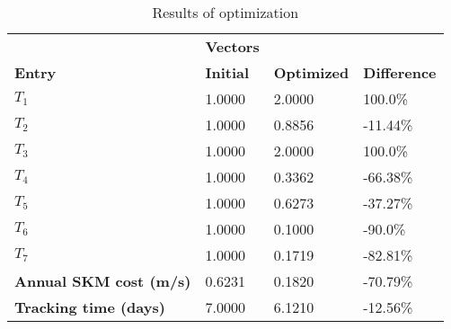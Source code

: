 \begin{table}[H]
\centering
\begin{tabular}{llll}
\textbf{}      & \cellcolor[HTML]{EFEFEF}\textbf{Vectors} & \textbf{} & \textbf{}         \\
\rowcolor[HTML]{EFEFEF} 
\textbf{Entry} & \textbf{Initial} & \textbf{Optimized} & \textbf{Difference} \\
$T_1$ & 1.0000 & 2.0000 & 100.0\% \\ 
$T_2$ & 1.0000 & 0.8856 & -11.44\% \\ 
$T_3$ & 1.0000 & 2.0000 & 100.0\% \\ 
$T_4$ & 1.0000 & 0.3362 & -66.38\% \\ 
$T_5$ & 1.0000 & 0.6273 & -37.27\% \\ 
$T_6$ & 1.0000 & 0.1000 & -90.0\% \\ 
$T_7$ & 1.0000 & 0.1719 & -82.81\% \\ 
\rowcolor[HTML]{EFEFEF} 
\textbf{Annual SKM cost (m/s)}  & 0.6231 & 0.1820 & -70.79\% \\ 
\rowcolor[HTML]{EFEFEF} 
\textbf{Tracking time (days)}  & 7.0000 & 6.1210 & -12.56\% \\ 
\end{tabular}
\caption{Results of optimization}
\label{tab:OptimizationAnalysis}
\end{table}